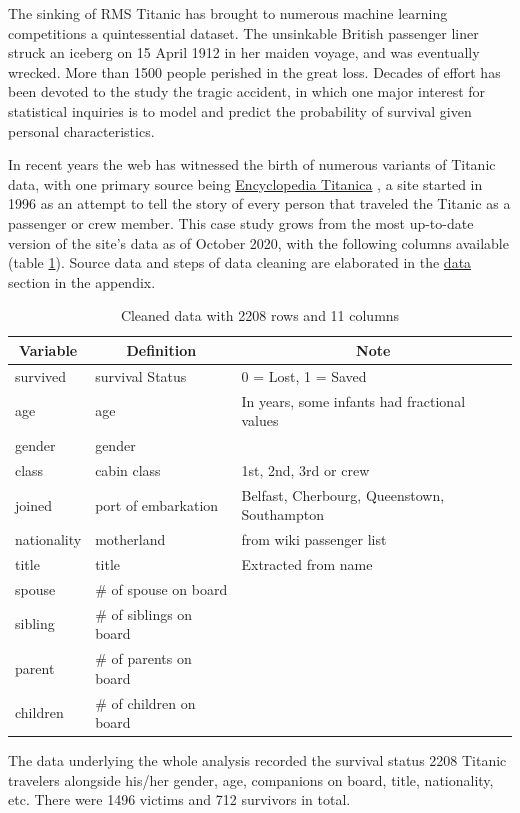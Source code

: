 \documentclass[]{interact}
\theoremstyle{plain}%
\theoremstyle{definition}
\theoremstyle{remark}
\begin{document}
The sinking of RMS Titanic has brought to numerous machine learning competitions a quintessential dataset. The unsinkable British passenger liner struck an iceberg on 15 April 1912 in her maiden voyage, and was eventually wrecked. More than 1500 people perished in the great loss. Decades of effort has been devoted to the study the tragic accident, in which one major interest for statistical inquiries is to model and predict the probability of survival given personal characteristics.

In recent years the web has witnessed the birth of numerous variants of Titanic data, with one primary source being \href{https://www.encyclopedia-titanica.org/}{Encyclopedia Titanica} \citeyearpar{hind}, a site started in 1996 as an attempt to tell the story of every person that traveled the Titanic as a passenger or
crew member. This case study grows from the most up-to-date version of the site's data as of October 2020, with the following columns available (table \ref{data-dictionary}). Source data and steps of data cleaning are elaborated in the \protect\hyperlink{data}{data} section in the appendix.

\begin{table}[h]
{\small
\caption{Cleaned data with 2208 rows and 11 columns\label{data-dictionary}} 
\begin{center}
\begin{tabular}{lll}
\hline\hline
\multicolumn{1}{c}{Variable}&\multicolumn{1}{c}{Definition}&\multicolumn{1}{c}{Note}\tabularnewline
\hline
survived&survival Status&0 = Lost, 1 = Saved\tabularnewline
age&age&In years, some infants had fractional values\tabularnewline
gender&gender&\tabularnewline
class&cabin class&1st, 2nd, 3rd or crew\tabularnewline
joined&port of embarkation&Belfast, Cherbourg, Queenstown, Southampton\tabularnewline
nationality&motherland&from wiki passenger list\tabularnewline
title&title&Extracted from name\tabularnewline
spouse&\# of spouse on board&\tabularnewline
sibling&\# of siblings on board&\tabularnewline
parent&\# of parents on board&\tabularnewline
children&\# of children on board&\tabularnewline
\hline
\end{tabular}\end{center}}
\end{table}

The data underlying the whole analysis recorded the survival status 2208 Titanic travelers alongside his/her gender, age, companions on board, title, nationality, etc. There were 1496 victims and 712 survivors in total.
\end{document}
